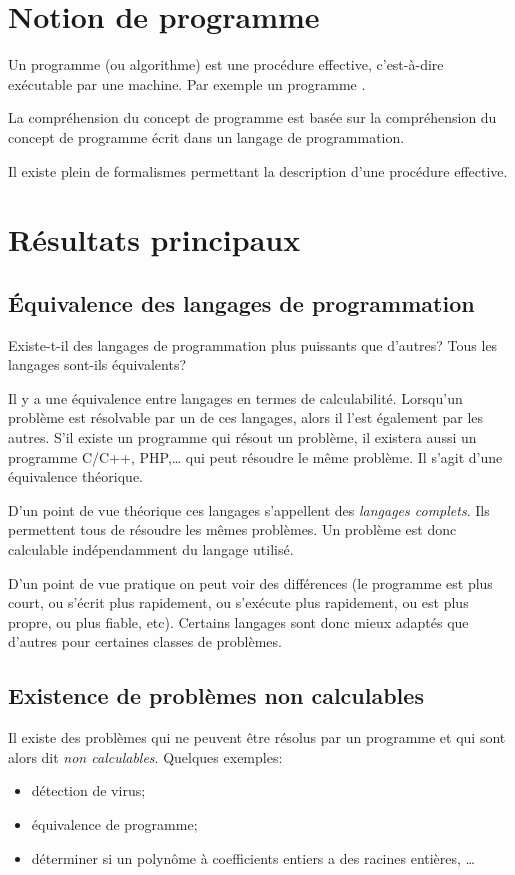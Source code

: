 \section{Notion de programme}
\label{sec:notion_de_programme}

Un programme (ou algorithme) est une \og procédure effective\fg, c'est-à-dire exécutable par une machine. Par exemple un programme \java.

La compréhension du concept de programme est basée sur la compréhension du concept de \og programme écrit dans un langage de programmation\fg.

Il existe plein de formalismes permettant la description d'une \og procédure effective\fg.

\section{Résultats principaux}
\label{sec:r_sultat_principaux}

\subsection{Équivalence des langages de programmation}
\label{subsec:equivalence_des_langages_de_programmation}

Existe-t-il des langages de programmation plus puissants que d'autres? Tous les langages sont-ils équivalents?

Il y a une équivalence entre langages en termes de calculabilité.  Lorsqu'un problème est résolvable par un de ces langages, alors il l'est également par les autres.
S'il existe un programme \java qui résout un problème, il existera aussi un programme C/C++, PHP,\ldots{} qui peut résoudre le même problème. Il s'agit d'une équivalence théorique.

D'un point de vue théorique ces langages s'appellent des \emph{langages complets}. Ils permettent tous de résoudre les mêmes problèmes. Un problème est donc calculable indépendamment du langage utilisé.

D'un point de vue pratique on peut voir des différences (le programme est plus court, ou s'écrit plus rapidement, ou s'exécute plus rapidement, ou est plus propre, ou plus fiable, etc). Certains langages sont donc mieux adaptés que d'autres pour certaines classes de problèmes.


\subsection{Existence de problèmes non calculables}
\label{subsec:existence_de_problemes_non_calculables}
	Il existe des problèmes qui ne peuvent être résolus par un programme et qui sont alors dit \emph{non calculables}.
	Quelques exemples:
	\begin{itemize}
		\item détection de virus;
		\item équivalence de programme;
		\item déterminer si un polynôme à coefficients entiers a des racines entières, \ldots
	\end{itemize}

